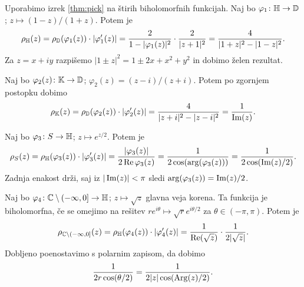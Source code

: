 \begin{dokaz}
    Uporabimo izrek \ref{thm:pick} na štirih biholomorfnih funkcijah. Naj bo \(\varphi_1 \colon \mathbb H \to \mathbb D\); \(z \mapsto (1 - z) / (1 + z)\). Potem je
    \[\rho_{\mathbb H} (z) = \rho_{\mathbb D} (\varphi_1 (z)) \cdot \left\lvert\varphi_1' (z)\right\rvert = \frac{2}{1 - |\varphi_1 (z)|^2} \cdot \frac{2}{|z + 1|^2} = \frac{4}{|1 + z|^2 - |1- z|^2}.\]
    Za \(z = x + i y\) razpišemo \(|1 \pm z|^2 = 1 \pm 2x + x^2 + y^2\) in dobimo želen rezultat.

    Naj bo \(\varphi_2 (z) \colon \mathbb K \to \mathbb D\); \(\varphi_2 (z) = (z - i) / (z + i)\). Potem po zgornjem postopku dobimo
    \[\rho_{\mathbb K} (z) = \rho_{\mathbb D} (\varphi_2 (z)) \cdot \left\lvert\varphi_2' (z)\right\rvert = \frac{4}{|z + i|^2 - |z - i|^2} = \frac{1}{\operatorname{Im} (z)}.\]

    \noindent Naj bo \(\varphi_3 \colon S \to \mathbb H\); \(z \mapsto e^{z / 2}\). Potem je
    \[\rho_S (z) = \rho_{\mathbb H} (\varphi_3 (z)) \cdot |\varphi_3' (z)| = \frac{|\varphi_3 (z)|}{2 \operatorname{Re} \varphi_3 (z)} = \frac{1}{2 \cos (\arg (\varphi_3 (z)))} = \frac{1}{2 \cos (\operatorname{Im} (z) / 2)}.\]
    Zadnja enakost drži, saj iz \(|\operatorname{Im} (z)| < \pi\) sledi \(\arg (\varphi_3 (z)) = \operatorname{Im} (z) / 2\).

    Naj bo \(\varphi_4 \colon \mathbb C \setminus (- \infty, 0] \to \mathbb H\); \(z \mapsto \sqrt{z}\) glavna veja korena. Ta funkcija je biholomorfna, če se omejimo na rešitev \(r e^{i \theta} \mapsto \sqrt{r} e^{i \theta / 2}\) za \(\theta \in (- \pi, \pi)\). Potem je
    \[\rho_{\mathbb C \setminus (- \infty, 0]} (z) = \rho_{\mathbb H} (\varphi_4 (z)) \cdot |\varphi_4' (z)| = \frac{1}{\operatorname{Re} (\sqrt{z})} \cdot \frac{1}{2 |\sqrt{z}|}.\]
    Dobljeno poenostavimo s polarnim zapisom, da dobimo
    \[\frac{1}{2 r \cos (\theta / 2)} = \frac{1}{2 |z| \cos (\operatorname{Arg} (z) / 2)}.\]
\end{dokaz}
